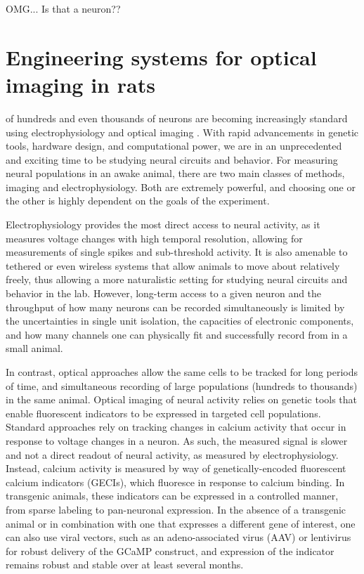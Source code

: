 \begin{savequote}[75mm]
OMG... Is that a neuron??
\end{savequote}

\chapter{Engineering systems for optical imaging in rats}
 of hundreds and even thousands of neurons are becoming increasingly standard using electrophysiology \cite{Steinmetz2019DistributedBehaviour, REFREF} and optical imaging \cite{Stringer2019High-dimensionalCortex, REFREF}. With rapid advancements in genetic tools, hardware design, and computational power, we are in an unprecedented and exciting time to be studying neural circuits and behavior. For measuring neural populations in an awake animal, there are two main classes of methods, imaging and electrophysiology. Both are extremely powerful, and choosing one or the other is highly dependent on the goals of the experiment. 

Electrophysiology provides the most direct access to neural activity, as it measures voltage changes with high temporal resolution, allowing for measurements of single spikes and sub-threshold activity\cite{REFREF}. It is also amenable to tethered or even wireless systems that allow animals to move about relatively freely, thus allowing a more naturalistic setting for studying neural circuits and behavior in the lab\cite{REFREF}. However, long-term access to a given neuron and the throughput of how many neurons can be recorded simultaneously is limited by the uncertainties in single unit isolation, the capacities of electronic components, and how many channels one can physically fit and successfully record from in a small animal. 

In contrast, optical approaches allow the same cells to be tracked for long periods of time, and simultaneous recording of large populations (hundreds to thousands) in the same animal. Optical imaging of neural activity relies on genetic tools that enable fluorescent indicators to be expressed in targeted cell populations. Standard approaches rely on tracking changes in calcium activity that occur in response to voltage changes in a neuron\cite{REFREF}. As such, the measured signal is slower and not a direct readout of neural activity, as measured by electrophysiology. Instead, calcium activity is measured by way of genetically-encoded fluorescent calcium indicators (GECIs)\cite{Akerboom2012, Chen2013}, which fluoresce in response to calcium binding. In transgenic animals, these indicators can be expressed in a controlled manner, from sparse labeling\cite{REFREF} to pan-neuronal expression\cite{REFREF}. In the absence of a transgenic animal or in combination with one that expresses a different gene of interest, one can also use viral vectors, such as an adeno-associated virus (AAV) or lentivirus\cite{REFREF} for robust delivery of the GCaMP construct, and expression of the indicator remains robust and stable over at least several months\cite{REFREF}.

